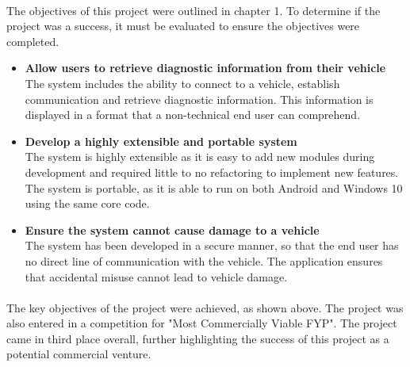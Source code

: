 	\paragraph{}{
	The objectives of this project were outlined in chapter 1. To determine if the project was a success, it must be evaluated to ensure the objectives were completed. 
		\begin{itemize}
			\item \textbf{Allow users to retrieve diagnostic information from their vehicle}\\
			The system includes the ability to connect to a vehicle, establish communication and retrieve diagnostic information. This information is displayed in a format that a non-technical end user can comprehend.
			
			\item \textbf{Develop a highly extensible and portable system}\\
			The system is highly extensible as it is easy to add new modules during development and required little to no refactoring to implement new features. The system is portable, as it is able to run on both Android and Windows 10 using the same core code. 

			\item \textbf{Ensure the system cannot cause damage to a vehicle}\\
			The system has been developed in a secure manner, so that the end user has no direct line of communication with the vehicle. The application ensures that accidental misuse cannot lead to vehicle damage. 
		\end{itemize}
	}
	\paragraph{}{
	The key objectives of the project were achieved, as shown above. The project was also entered in a competition for "Most Commercially Viable FYP". The project came in third place overall, further highlighting the success of this project as a potential commercial venture.
	}
	
